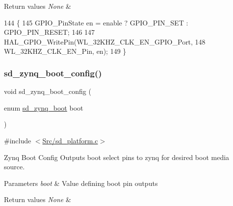 \begin{DoxyRetVals}{Return values}
{\em None} & \\
\hline
\end{DoxyRetVals}

\begin{DoxyCode}
144 \{
145     GPIO\_PinState en = enable ? GPIO\_PIN\_SET : GPIO\_PIN\_RESET;
146 
147     HAL\_GPIO\_WritePin(WL\_32KHZ\_CLK\_EN\_GPIO\_Port, 
148               WL\_32KHZ\_CLK\_EN\_Pin, en);
149 \}
\end{DoxyCode}
\mbox{\label{group___s_d___platform___boot___config_ga759f86160fc8d270309fc2a74e4139e3}} 
\subsubsection{\texorpdfstring{sd\+\_\+zynq\+\_\+boot\+\_\+config()}{sd\_zynq\_boot\_config()}}
{\footnotesize\ttfamily void sd\+\_\+zynq\+\_\+boot\+\_\+config (\begin{DoxyParamCaption}\item[{enum \mbox{\hyperlink{group___s_d___platform_ga06667de95c86bfcdef8bcc8ab13cb2d4}{sd\+\_\+zynq\+\_\+boot}}}]{boot }\end{DoxyParamCaption})}



{\ttfamily \#include $<$\mbox{\hyperlink{sd__platform_8c}{Src/sd\+\_\+platform.\+c}}$>$}



Zynq Boot Config Outputs boot select pins to zynq for desired boot media source. 


\begin{DoxyParams}{Parameters}
{\em boot} & Value defining boot pin outputs \\
\hline
\end{DoxyParams}

\begin{DoxyRetVals}{Return values}
{\em None} & \\
\hline
\end{DoxyRetVals}

